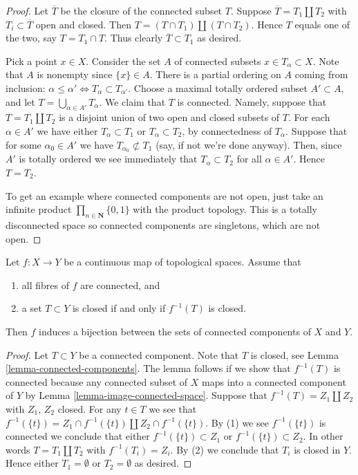 \begin{proof}
Let $\overline{T}$ be the closure of the connected subset $T$.
Suppose $\overline{T} = T_1 \coprod T_2$ with $T_i \subset \overline{T}$
open and closed. Then $T = (T\cap T_1) \coprod (T \cap T_2)$. Hence
$T$ equals one of the two, say $T = T_1 \cap T$. Thus clearly
$\overline{T} \subset T_1$ as desired.

\medskip\noindent
Pick a point $x\in X$. Consider the set $A$ of connected subsets
$x \in T_\alpha \subset X$. Note that $A$ is nonempty since
$\{x\} \in A$. There is a partial ordering on $A$ coming from
inclusion: $\alpha \leq \alpha' \Leftrightarrow T_\alpha \subset T_{\alpha'}$.
Choose a maximal totally ordered subset $A' \subset A$, and let
$T = \bigcup_{\alpha \in A'} T_\alpha$. We claim that $T$ is
connected. Namely, suppose that $T =  T_1 \coprod T_2$ is a disjoint
union of two open and closed subsets of $T$.
For each $\alpha \in A'$ we have either $T_\alpha \subset T_1$
or $T_\alpha \subset T_2$, by connectedness of $T_\alpha$.
Suppose that for some $\alpha_0 \in A'$ we have
$T_{\alpha_0} \not\subset T_1$ (say, if not we're done anyway).
Then, since $A'$ is totally ordered we see immediately that
$T_\alpha \subset T_2$ for all $\alpha \in A'$. Hence $T = T_2$.

\medskip\noindent
To get an example
where connected components are not open, just take
an infinite product $\prod_{n \in \mathbf{N}} \{0, 1\}$
with the product topology. This is a totally disconnected
space so connected components are singletons, which are
not open.
\end{proof}

\begin{lemma}
\label{lemma-connected-fibres-quotient-topology-connected-components}
Let $f : X \to Y$ be a continuous map of topological spaces.
Assume that
\begin{enumerate}
\item all fibres of $f$ are connected, and
\item a set $T \subset Y$ is closed if and only if $f^{-1}(T)$ is closed.
\end{enumerate}
Then $f$ induces a bijection between the sets of connected
components of $X$ and $Y$.
\end{lemma}

\begin{proof}
Let $T \subset Y$ be a connected component.
Note that $T$ is closed, see Lemma \ref{lemma-connected-components}.
The lemma follows if we show that $f^{-1}(T)$ is connected
because any connected subset of $X$ maps into a connected component
of $Y$ by Lemma \ref{lemma-image-connected-space}.
Suppose that $f^{-1}(T) = Z_1 \coprod Z_2$
with $Z_1$, $Z_2$ closed. For any $t \in T$ we see that
$f^{-1}(\{t\}) = Z_1 \cap f^{-1}(\{t\}) \coprod Z_2 \cap f^{-1}(\{t\})$.
By (1) we see $f^{-1}(\{t\})$ is connected we conclude that
either $f^{-1}(\{t\}) \subset Z_1$ or $f^{-1}(\{t\}) \subset Z_2$.
In other words $T = T_1 \coprod T_2$ with $f^{-1}(T_i) = Z_i$.
By (2) we conclude that $T_i$ is closed in $Y$.
Hence either $T_1 = \emptyset$ or $T_2 = \emptyset$ as desired.
\end{proof}

